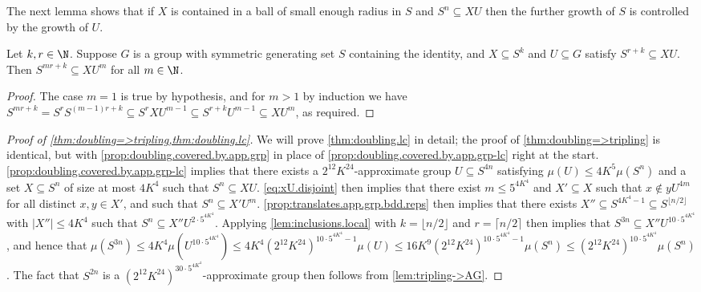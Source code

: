 The next lemma shows that if $X$ is contained in a ball of small enough radius in $S$ and $S^n\subseteq XU$ then the further growth of $S$ is controlled by the growth of $U$.


\begin{lemma}\label{lem:inclusions.local}
Let $k,r\in\N$. Suppose $G$ is a group with symmetric generating set $S$ containing the identity, and $X\subseteq S^k$ and $U\subseteq G$ satisfy $S^{r+k}\subseteq XU$. Then $S^{mr+k}\subseteq XU^m$ for all $m\in\N$.
\end{lemma}
\begin{proof}
The case $m=1$ is true by hypothesis, and for $m>1$ by induction we have $S^{mr+k}=S^rS^{(m-1)r+k}\subseteq S^rXU^{m-1}\subseteq S^{r+k}U^{m-1}\subseteq XU^m$, as required.
\end{proof}


\begin{proof}[Proof of \cref{thm:doubling=>tripling,thm:doubling.lc}]
We will prove \cref{thm:doubling.lc} in detail; the proof of \cref{thm:doubling=>tripling} is identical, but with \cref{prop:doubling.covered.by.app.grp} in place of \cref{prop:doubling.covered.by.app.grp-lc} right at the start. \cref{prop:doubling.covered.by.app.grp-lc} implies that there exists a $2^{12}K^{24}$-approximate group $U\subseteq S^{4n}$ satisfying $\mu(U)\le4K^5\mu(S^n)$ and a set $X\subseteq S^n$ of size at most $4K^4$ such that $S^n\subseteq XU$. \cref{eq:xU.disjoint} then implies that there exist $m\le5^{4K^4}$ and $X'\subseteq X$ such that $x\notin yU^{4m}$ for all distinct $x,y\in X'$, and such that $S^n\subseteq X'U^m$. \cref{prop:translates.app.grp.bdd.reps} then implies that there exists $X''\subseteq S^{4K^4-1}\subseteq S^{\lfloor n/2\rfloor}$ with $|X''|\le4K^4$ such that $S^n\subseteq X''U^{2\cdot5^{4K^4}}$. Applying \cref{lem:inclusions.local} with $k=\lfloor n/2\rfloor$ and $r=\lceil n/2\rceil$ then implies that $S^{3n}\subseteq X''U^{10\cdot5^{4K^4}}$, and hence that $\mu(S^{3n})\le4K^4\mu(U^{10\cdot5^{4K^4}})\le4K^4(2^{12}K^{24})^{10\cdot5^{4K^4}-1}\mu(U)\le16K^9(2^{12}K^{24})^{10\cdot5^{4K^4}-1}\mu(S^n)\le(2^{12}K^{24})^{10\cdot5^{4K^4}}\mu(S^n)$. The fact that $S^{2n}$ is a $(2^{12}K^{24})^{30\cdot5^{4K^4}}$-approximate group then follows from \cref{lem:tripling->AG}.
\end{proof}
